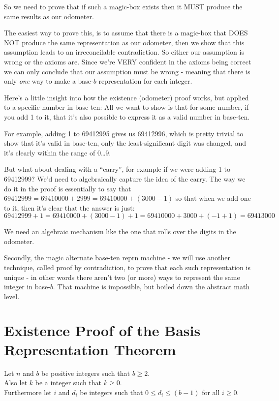 \documentclass{article}
\begin{document}
So we need to prove that if such a magic-box exists then it MUST
produce the same results as our odometer.

The easiest way to prove this, is to assume that there is a magic-box
that DOES NOT produce the same representation as our odometer, then we show that
this assumption leads to an irreconcilable contradiction.
So either our assumption is wrong or the axioms are.
Since we're VERY confident in the axioms being correct we can only 
conclude that our assumption must be wrong - meaning
that there is only \emph{one} way 
to make a base-$b$ representation for each integer.

\bigskip
Here's a little insight into how the existence (odometer)
proof works, but applied to a specific number in base-ten:
All we want to show is that for some number,
if you add 1 to it, that it's also possible to express it as a valid number in base-ten.

For example, adding 1 to 69412995 gives us 69412996,
which is pretty trivial to show that it's valid in base-ten,
only the least-significant digit was
changed, and it's clearly within the range of 0\dots{}9.

But what about dealing with a ``carry'', for example 
if we were adding 1 to 69412999? We'd need to algebraically
capture the idea of the carry.  The way
we do it in the proof is essentially to say that
$69412999 = 69410000 + 2999 = 69410000 + (3000-1)$
so that when we add one to it, then
it's clear that the answer is just:
\[69412999 + 1 = 69410000 + (3000-1) + 1 = 69410000 + 3000 + (-1 + 1) = 69413000\]

We need an algebraic mechanism like the one that rolls over the digits in the odometer.

Secondly, the magic alternate base-ten reprn machine - we
will use another technique, called proof by contradiction,
to prove that each such representation is unique - in other
words there aren't two (or more) ways to represent the same
integer in base-$b$.  That machine is impossible, but
boiled down the abstract math level.

\section*{Existence Proof of the Basis Representation Theorem}
Let $n$ and $b$ be positive integers such that $b\ge2$.\\
Also let $k$ be a integer such that $k\ge0$.\\
Furthermore let $i$ and $d_i$ be integers such that $0\le{}d_i\le{}(b-1)$ for all $i\ge0$.
\end{document}
